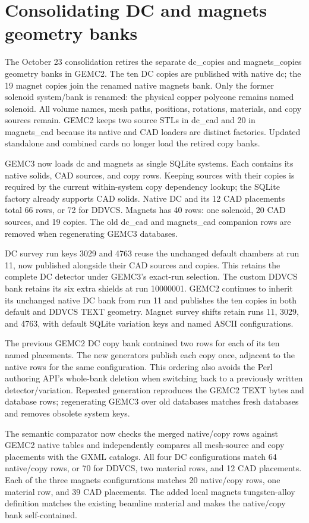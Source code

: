 \FloatBarrier
\section{Consolidating DC and magnets geometry banks}
\label{sec:detector-banks}

The October 23 consolidation retires the separate dc\_copies and magnets\_copies geometry banks in GEMC2. The
ten DC copies are published with native dc; the 19 magnet copies join the renamed native magnets bank. Only
the former solenoid system/bank is renamed: the physical copper polycone remains named solenoid. All volume
names, mesh paths, positions, rotations, materials, and copy sources remain. GEMC2 keeps two source STLs in
dc\_cad and 20 in magnets\_cad because its native and CAD loaders are distinct factories. Updated standalone
and combined cards no longer load the retired copy banks.

GEMC3 now loads dc and magnets as single SQLite systems. Each contains its native solids, CAD sources, and
copy rows. Keeping sources with their copies is required by the current within-system copy dependency lookup;
the SQLite factory already supports CAD solids. Native DC and its 12 CAD placements total 66 rows, or 72 for
DDVCS. Magnets has 40 rows: one solenoid, 20 CAD sources, and 19 copies. The old dc\_cad and magnets\_cad
companion rows are removed when regenerating GEMC3 databases.

DC survey run keys 3029 and 4763 reuse the unchanged default chambers at run 11, now published alongside their
CAD sources and copies. This retains the complete DC detector under GEMC3's exact-run selection. The custom
DDVCS bank retains its six extra shields at run 10000001. GEMC2 continues to inherit its unchanged native DC
bank from run 11 and publishes the ten copies in both default and DDVCS TEXT geometry. Magnet survey shifts
retain runs 11, 3029, and 4763, with default SQLite variation keys and named ASCII configurations.

The previous GEMC2 DC copy bank contained two rows for each of its ten named placements. The new generators
publish each copy once, adjacent to the native rows for the same configuration. This ordering also avoids the
Perl authoring API's whole-bank deletion when switching back to a previously written detector/variation.
Repeated generation reproduces the GEMC2 TEXT bytes and database rows; regenerating GEMC3 over old databases
matches fresh databases and removes obsolete system keys.

The semantic comparator now checks the merged native/copy rows against GEMC2 native tables and independently
compares all mesh-source and copy placements with the GXML catalogs. All four DC configurations match 64
native/copy rows, or 70 for DDVCS, two material rows, and 12 CAD placements. Each of the three magnets
configurations matches 20 native/copy rows, one material row, and 39 CAD placements. The added local magnets
tungsten-alloy definition matches the existing beamline material and makes the native/copy bank
self-contained.

